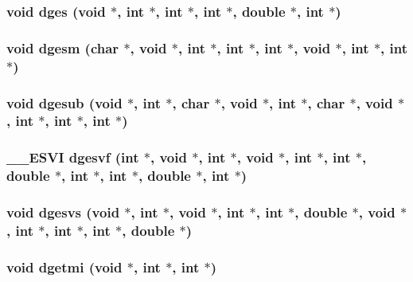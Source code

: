 \subsubsection{\setlength{\rightskip}{0pt plus 5cm}void dges (void $\ast$, int $\ast$, int $\ast$, int $\ast$, double $\ast$, int $\ast$)}\label{essl_8h_724b7353c5d5a727e2c88058bb30e502}


\subsubsection{\setlength{\rightskip}{0pt plus 5cm}void dgesm (char $\ast$, void $\ast$, int $\ast$, int $\ast$, int $\ast$, void $\ast$, int $\ast$, int $\ast$)}\label{essl_8h_d6f9153031cbc15ed7278697423dfc6d}


\subsubsection{\setlength{\rightskip}{0pt plus 5cm}void dgesub (void $\ast$, int $\ast$, char $\ast$, void $\ast$, int $\ast$, char $\ast$, void $\ast$, int $\ast$, int $\ast$, int $\ast$)}\label{essl_8h_4a7f9defba5179705d04c90e37290593}


\subsubsection{\setlength{\rightskip}{0pt plus 5cm}\_\-\_\-ESVI dgesvf (int $\ast$, void $\ast$, int $\ast$, void $\ast$, int $\ast$, int $\ast$, double $\ast$, int $\ast$, int $\ast$, double $\ast$, int $\ast$)}\label{essl_8h_6acdf7c741dbcf70b0e09e60f0e3e64a}


\subsubsection{\setlength{\rightskip}{0pt plus 5cm}void dgesvs (void $\ast$, int $\ast$, void $\ast$, int $\ast$, int $\ast$, double $\ast$, void $\ast$, int $\ast$, int $\ast$, int $\ast$, double $\ast$)}\label{essl_8h_cc7ec02352373c420655504dacd1400a}


\subsubsection{\setlength{\rightskip}{0pt plus 5cm}void dgetmi (void $\ast$, int $\ast$, int $\ast$)}\label{essl_8h_6cd5a423121a65f5deb4df80a19fcb8a}


